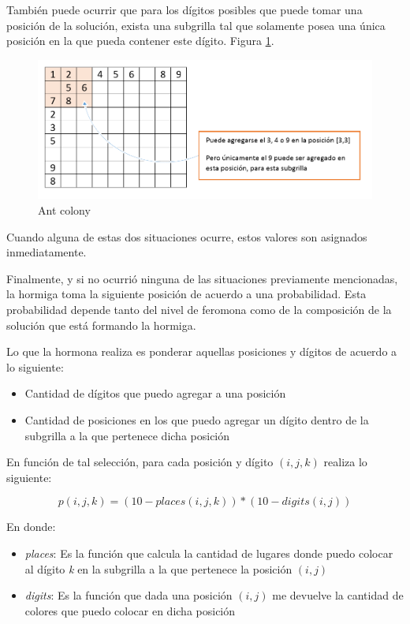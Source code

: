 \documentclass[a4paper,spanish]{article}
\begin{document}
También puede ocurrir que para los dígitos posibles que puede tomar una posición de la solución,
exista una subgrilla tal que solamente posea una única posición en la que pueda contener este dígito.
Figura \ref{img:undigitosolo}.

\begin{figure}[h]
	\centering
	\includegraphics[scale=0.4]{./img/undigitosolo.png}
	\caption{Ant colony}
	\label{img:undigitosolo}
\end{figure}

Cuando alguna de estas dos situaciones ocurre, estos valores son asignados inmediatamente.

Finalmente, y si no ocurrió ninguna de las situaciones previamente mencionadas, la hormiga toma la
siguiente posición de acuerdo a una probabilidad. Esta probabilidad depende tanto del nivel de
feromona como de la composición de la solución que está formando la hormiga.

Lo que la hormona realiza es ponderar aquellas posiciones y dígitos de acuerdo a lo siguiente:

\begin{itemize}
	\item Cantidad de dígitos que puedo agregar a una posición
	\item Cantidad de posiciones en los que puedo agregar un dígito dentro de la subgrilla a la que
		  pertenece dicha posición
\end{itemize}

En función de tal selección, para cada posición y dígito $(i,j,k)$ realiza lo siguiente:

\begin{equation}
	p(i,j,k)=(10-places(i,j,k))*(10-digits(i,j))
\end{equation}

\pagebreak

En donde:

\begin{itemize}
	\item \emph{places}: Es la función que calcula la cantidad de lugares donde puedo colocar al
		  dígito \emph{k} en la subgrilla a la que pertenece la posición $(i,j)$
	\item \emph{digits}: Es la función que dada una posición $(i,j)$ me devuelve la cantidad de
	      colores que puedo colocar en dicha posición
\end{itemize}
\end{document}
